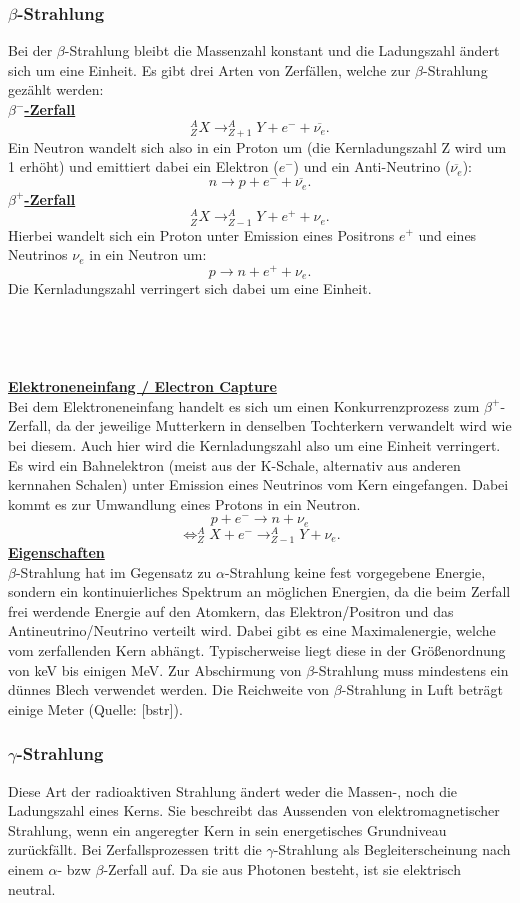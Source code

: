 \subsubsection{$\beta$-Strahlung}
Bei der $\beta$-Strahlung bleibt die Massenzahl konstant und die Ladungszahl ändert sich um eine Einheit. Es gibt drei Arten von Zerfällen, welche zur $\beta$-Strahlung gezählt werden:\\
\textbf{\uline{$\beta^{-}$-Zerfall}}
\[^{A}_{Z}X\rightarrow ^{A}_{Z+1}Y+e^{-}+\overline{\nu_{e}}.\] Ein Neutron wandelt sich also in ein Proton um (die Kernladungszahl Z wird um 1 erhöht) und emittiert dabei ein Elektron ($e^{-}$) und ein Anti-Neutrino ($\overline{\nu_{e}}$): \[n\rightarrow p+e^{-}+\overline{\nu_{e}}.\]
\textbf{\uline{$\beta^{+}$-Zerfall}}
\[^{A}_{Z}X\rightarrow ^{A}_{Z-1}Y+e^{+}+\nu_{e}.\]
Hierbei wandelt sich ein Proton unter Emission eines Positrons $e^{+}$ und eines Neutrinos $\nu_{e}$ in ein Neutron um: \[p\rightarrow n+e^{+}+\nu_{e}.\] Die Kernladungszahl verringert sich dabei um eine Einheit.\\
~\\
~\\
~\\
~\\
\textbf{\uline{Elektroneneinfang / Electron Capture}}\\
Bei dem Elektroneneinfang handelt es sich um einen Konkurrenzprozess zum $\beta^{+}$-Zerfall, da der jeweilige Mutterkern in denselben Tochterkern verwandelt wird wie bei diesem. Auch hier wird die Kernladungszahl also um eine Einheit verringert.
Es wird ein Bahnelektron (meist aus der K-Schale, alternativ aus anderen kernnahen Schalen) unter Emission eines Neutrinos vom Kern eingefangen. Dabei kommt es zur Umwandlung eines Protons in ein Neutron. \[p+e^{-}\rightarrow n+\nu_{e}\]
\[\Leftrightarrow ^{A}_{Z}X+e^{-}\rightarrow ^{A}_{Z-1}Y+\nu_{e}.\]
\textbf{\uline{Eigenschaften}}\\
$\beta$-Strahlung hat im Gegensatz zu $\alpha$-Strahlung keine fest vorgegebene Energie, sondern ein kontinuierliches Spektrum an möglichen Energien, da die beim Zerfall frei werdende Energie auf den Atomkern, das Elektron/Positron und das Antineutrino/Neutrino verteilt wird. Dabei gibt es eine Maximalenergie, welche vom zerfallenden Kern abhängt. Typischerweise liegt diese in der Größenordnung von keV bis einigen MeV. Zur Abschirmung von $\beta$-Strahlung muss mindestens ein dünnes Blech verwendet werden. Die Reichweite von $\beta$-Strahlung in Luft beträgt einige Meter (Quelle: [bstr]).
\subsubsection{$\gamma$-Strahlung}
Diese Art der radioaktiven Strahlung ändert weder die Massen-, noch die Ladungszahl eines Kerns. Sie beschreibt das Aussenden von elektromagnetischer Strahlung, wenn ein angeregter Kern in sein energetisches Grundniveau zurückfällt. Bei Zerfallsprozessen tritt die $\gamma$-Strahlung als Begleiterscheinung nach einem $\alpha$- bzw $\beta$-Zerfall auf. Da sie aus Photonen besteht, ist sie elektrisch neutral.

